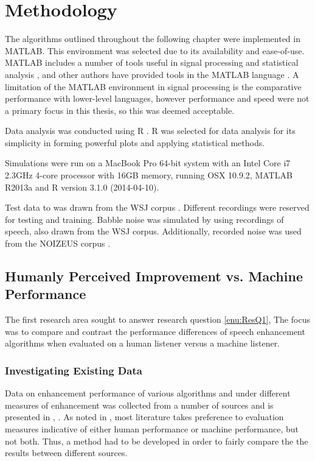 
\chapter{Methodology}

\acresetall

The algorithms outlined throughout the following chapter were implemented
in MATLAB. This environment was selected due to its availability and
ease-of-use. MATLAB includes a number of tools useful in signal processing
and statistical analysis \citep{Krauss1994,Jones1997}, and other
authors have provided tools in the MATLAB language \citep{Hoyer2004,Brookes1997,Loizou2008,Wojcicki2011}.
A limitation of the MATLAB environment in signal processing is the
comparative performance with lower-level languages, however performance
and speed were not a primary focus in this thesis, so this was deemed
acceptable.

Data analysis was conducted using R \citep{RCoreTeam2014}. R was
selected for data analysis for its simplicity in forming powerful
plots and applying statistical methods.

Simulations were run on a MacBook Pro 64-bit system with an Intel
Core i7 2.3GHz 4-core processor with 16GB memory, running OSX 10.9.2,
MATLAB R2013a and R version 3.1.0 (2014-04-10).

Test data to was drawn from the \ac{WSJ} corpus \citep{Robinson1995}.
Different recordings were reserved for testing and training. Babble
noise was simulated by using recordings of speech, also drawn from
the \ac{WSJ} corpus. Additionally, recorded noise was used from the
NOIZEUS corpus \citep{Hu2006}.


\section{Humanly Perceived Improvement vs. Machine Performance}

The first research area sought to answer research question \vref{enu:ResQ1},
\textit{\RQone{}} The focus was to compare and contrast the performance
differences of speech enhancement algorithms when evaluated on a human
listener versus a machine listener.


\subsection{\label{sub:Method-Existing-Data}Investigating Existing Data}

Data on enhancement performance of various algorithms and under different
measures of enhancement was collected from a number of sources \citep{mohammadiha2013supervised,Wilson2008,Schmidt2006,Raj2005,Rennie2008,Weninger2011,Williamson2014,Paliwal2010,Plourde2007}
and is presented in , . As
noted in  \textit{},
most literature takes preference to evaluation measures indicative
of either human performance or machine performance, but not both.
Thus, a method had to be developed in order to fairly compare the
the results between different sources.

